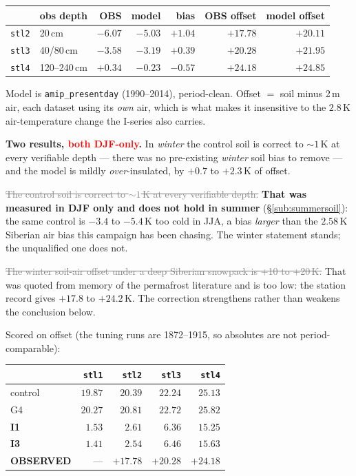 \documentclass[10pt]{article}
\newcommand{\dead}[1]{\textcolor{gray}{\sout{#1}}}
\begin{document}
\begin{center}\footnotesize
\begin{tabular}{l l r r r r r}
\toprule
 & obs depth & OBS & model & bias & OBS offset & model offset \\
\midrule
\texttt{stl2} & 20\,cm & $-6.07$ & $-5.03$ & $\mathbf{+1.04}$ & $\mathbf{+17.78}$ & $+20.11$ \\
\texttt{stl3} & 40/80\,cm & $-3.58$ & $-3.19$ & $\mathbf{+0.39}$ & $\mathbf{+20.28}$ & $+21.95$ \\
\texttt{stl4} & 120--240\,cm & $+0.34$ & $-0.23$ & $\mathbf{-0.57}$ & $\mathbf{+24.18}$ & $+24.85$ \\
\bottomrule
\end{tabular}
\end{center}

\noindent Model is \texttt{amip\_presentday} (1990--2014), period-clean. Offset $=$ soil minus
2\,m air, each dataset using its \emph{own} air, which is what makes it insensitive to the
$2.8$\,K air-temperature change the I-series also carries.

\textbf{Two results, \textcolor{red}{both DJF-only}.} In \emph{winter} the control soil is
correct to ${\sim}1$\,K at every verifiable depth --- there was no pre-existing \emph{winter}
soil bias to remove --- and the model is mildly \emph{over}-insulated, by $+0.7$ to $+2.3$\,K
of offset.

\dead{The control soil is correct to ${\sim}1$\,K at every verifiable depth.} \textbf{That was
measured in DJF only and does not hold in summer} (\S\ref{sub:summersoil}): the same control
is $-3.4$ to $-5.4$\,K too cold in JJA, a bias \emph{larger} than the $2.58$\,K Siberian air
bias this campaign has been chasing. The winter statement stands; the unqualified one does not.

\dead{The winter soil-air offset under a deep Siberian snowpack is +10 to +20\,K.} That was
quoted from memory of the permafrost literature and is too low: the station record gives
$+17.8$ to $+24.2$\,K. The correction strengthens rather than weakens the conclusion below.

Scored on offset (the tuning runs are 1872--1915, so absolutes are not period-comparable):

\begin{center}\footnotesize
\begin{tabular}{l r r r r}
\toprule
 & \texttt{stl1} & \texttt{stl2} & \texttt{stl3} & \texttt{stl4} \\
\midrule
control & $19.87$ & $20.39$ & $22.24$ & $25.13$ \\
G4 & $20.27$ & $20.81$ & $22.72$ & $25.82$ \\
\textbf{I1} & $\mathbf{1.53}$ & $\mathbf{2.61}$ & $\mathbf{6.36}$ & $\mathbf{15.25}$ \\
\textbf{I3} & $1.41$ & $2.54$ & $6.46$ & $15.63$ \\
\midrule
\textbf{OBSERVED} & --- & $\mathbf{+17.78}$ & $\mathbf{+20.28}$ & $\mathbf{+24.18}$ \\
\bottomrule
\end{tabular}
\end{center}
\end{document}
